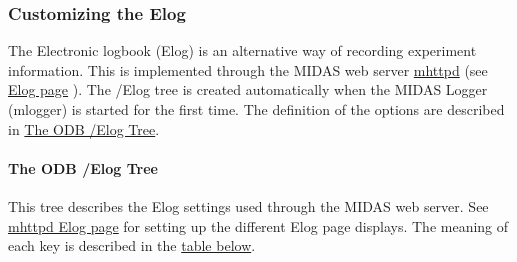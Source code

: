 \par
 

 \par
\hypertarget{F_Elog_F_Elog_Custom}{}\subsubsection{Customizing the Elog}\label{F_Elog_F_Elog_Custom}
The Electronic logbook (Elog) is an alternative way of recording experiment information. This is implemented through the MIDAS web server \hyperlink{RC_mhttpd_utility}{mhttpd} (see \hyperlink{RC_mhttpd_Elog_page}{Elog page} ). The /Elog tree is created automatically when the MIDAS Logger (mlogger) is started for the first time. The definition of the options are described in \hyperlink{F_Elog_F_ODB_Elog_Tree}{The ODB /Elog Tree}.

\label{F_Elog_idx_ODB_tree_Elog}
\hypertarget{F_Elog_idx_ODB_tree_Elog}{}
 \hypertarget{F_Elog_F_ODB_Elog_Tree}{}\paragraph{The ODB /Elog Tree}\label{F_Elog_F_ODB_Elog_Tree}
This tree describes the Elog settings used through the MIDAS web server. See \hyperlink{RC_mhttpd_Elog_page}{mhttpd Elog page} for setting up the different Elog page displays. The meaning of each key is described in the \hyperlink{F_Elog_F_ODB_Elog_Tree_Keys}{table below}.


